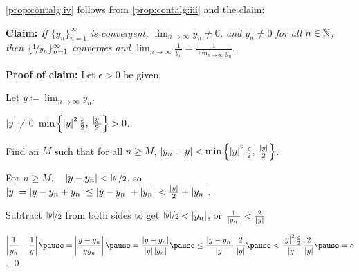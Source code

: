 \documentclass[10pt,aspectratio=169]{beamer}
\begin{document}
\begin{frame}

\eqref{prop:contalg:iv} follows from 
\eqref{prop:contalg:iii} and the claim:

\medskip

\textbf{Claim:} \emph{If $\{ y_n \}_{n=1}^\infty$ is convergent,
$\displaystyle \lim_{n\to\infty} y_n \not= 0$, and $y_n \not= 0$ for all $n \in {\mathbb{N}}$, then
$\{ \nicefrac{1}{y_n} \}_{n=1}^\infty$ converges and}
$\displaystyle \lim_{n\to\infty} \frac{1}{y_n} = \frac{1}{\lim_{n\to\infty} y_n}$.

\pause
\medskip

\textbf{Proof of claim:}  Let $\epsilon > 0$ be given.

\pause
Let $\displaystyle y \coloneqq \lim_{n\to\infty} y_n$.

\pause
$\left\lvert {y} \right\rvert \not= 0$ \wthus $\min \left\{ \left\lvert {y} \right\rvert^2\frac{\epsilon}{2}, \, \frac{\left\lvert {y} \right\rvert}{2} \right\} > 0$.

\pause
Find an $M$ such that for all $n \geq M$,
\quad $\left\lvert {y_n - y} \right\rvert < \min \left\{ \left\lvert {y} \right\rvert^2\frac{\epsilon}{2}, \, \frac{\left\lvert {y} \right\rvert}{2}
\right\}$.

\pause
\medskip

For $n \geq M$, ~
$\left\lvert {y - y_n} \right\rvert < \nicefrac{\left\lvert {y} \right\rvert}{2}$, so
\pause
~~
$\left\lvert {y} \right\rvert = 
\left\lvert {y - y_n + y_n } \right\rvert \leq
\left\lvert {y - y_n} \right\rvert + \left\lvert { y_n } \right\rvert < \frac{\left\lvert {y} \right\rvert}{2} + \left\lvert {y_n} \right\rvert$.

\pause
\medskip

Subtract $\nicefrac{\left\lvert {y} \right\rvert}{2}$ from both sides to get
$\nicefrac{\left\lvert {y} \right\rvert}{2} < \left\lvert {y_n} \right\rvert$, \quad or \quad
$\frac{1}{\left\lvert {y_n} \right\rvert} < \frac{2}{\left\lvert {y} \right\rvert}$

\pause
\medskip
$\displaystyle
\abs{\frac{1}{y_n} - \frac{1}{y}}
\pause
=
\abs{\frac{y - y_n}{y y_n}} 
\pause
=
\frac{\abs{y - y_n}}{\abs{y} \abs{y_n}} 
\pause
\leq
\frac{\abs{y - y_n}}{\abs{y}} \, \frac{2}{\abs{y}} 
\pause
<
\frac{\abs{y}^2 \frac{\epsilon}{2}}{\abs{y}} \, \frac{2}{\abs{y}}
\pause
= \epsilon$.
\qed

\end{frame}
\end{document}
